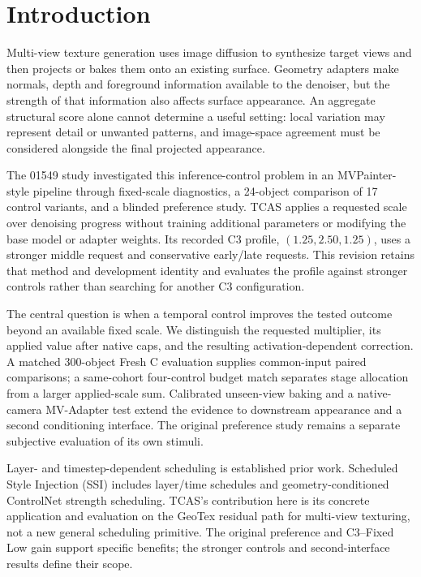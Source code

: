 \documentclass[times,twocolumn,final]{elsarticle}
\providecommand{\DIFadd}[1]{{\protect\color{blue} \sf #1}} %
\providecommand{\DIFaddbegin}{} %
\providecommand{\DIFaddend}{} %
\begin{document}
\linenumbers

\section{Introduction}
\label{sec:intro}

 
 \DIFaddbegin \DIFadd{Multi-view texture generation uses image diffusion to synthesize target views and then projects or bakes them onto an existing surface. Geometry adapters make normals, depth and foreground information available to the denoiser, but the strength of that information also affects surface appearance. An aggregate structural score alone cannot determine a useful setting: local variation may represent detail or unwanted patterns, }\DIFaddend and   \DIFaddbegin \DIFadd{image-space agreement must be considered alongside the final projected appearance}\DIFaddend .

 
 \DIFaddbegin \DIFadd{The 01549 study investigated this inference-control problem in an MVPainter-style pipeline through fixed-scale diagnostics, a 24-object comparison of 17 control variants, and a blinded preference study. TCAS applies a requested scale over denoising progress without training additional parameters or modifying the base model or adapter weights. Its recorded C3 profile, $(1.25,2.50,1.25)$, uses a stronger middle request and conservative early/late requests. This revision retains that method and development identity and evaluates the profile against stronger controls rather than searching for another C3 configuration.
}\DIFaddend 

  \DIFaddbegin \DIFadd{The central question is when a temporal control improves the tested outcome beyond an available fixed scale. We distinguish the requested multiplier, its applied value after native caps, and the resulting activation-dependent correction. A matched 300-object Fresh C evaluation supplies common-input paired comparisons; a same-cohort four-control budget match separates stage allocation from a larger applied-scale sum. Calibrated unseen-view baking and a native-camera MV-Adapter test extend the evidence to downstream appearance and a second conditioning interface. The original preference study remains a separate subjective evaluation of its own stimuli}\DIFaddend .

 
 \DIFaddbegin \DIFadd{Layer- and timestep-dependent scheduling is established prior work. Scheduled Style Injection (SSI) includes layer/time schedules and geometry-conditioned ControlNet strength scheduling. TCAS's contribution here is its concrete application and evaluation on the GeoTex residual path for }\DIFaddend multi-view   \DIFaddbegin \DIFadd{texturing, not a new general scheduling primitive. The original preference and C3--Fixed Low gain support specific benefits; the stronger controls and second-interface results define their scope}\DIFaddend .
\end{document}
